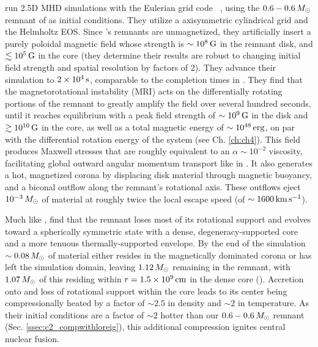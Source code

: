 \cite{ji+13} run 2.5D MHD simulations with the Eulerian grid code \flash\ \citep{fryx+00}, using the $0.6 - 0.6\,\Msun$ remnant of \citeal{loreig09} as initial conditions.  They utilize a axisymmetric cylindrical grid and the Helmholtz EOS.  Since \citeal{loreig09}'s remnants are unmagnetized, they artificially insert a purely poloidal magnetic field whose strength is $\sim10^8\,\mathrm{G}$ in the remnant disk, and $\lesssim10^5\,\mathrm{G}$ in the core (they determine their results are robust to changing initial field strength and spatial resolution by factors of 2).  They advance their simulation to $2\times10^4\,\mathrm{s}$, comparable to the completion times in \cite{schw+12}.  They find that the magnetorotational instability (MRI) acts on the differentially rotating portions of the remnant to greatly amplify the field over several hundred seconds, until it reaches equilibrium with a peak field strength of $\sim10^9\,\mathrm{G}$ in the disk and $\gtrsim10^{10}\,\mathrm{G}$ in the core, as well as a total magnetic energy of $\sim10^{48}\,\mathrm{erg}$, on par with the differential rotation energy of the system (see Ch. \ref{ch:ch4}).  This field produces Maxwell stresses that are roughly equivalent to an $\alpha \sim 10^{-2}$ viscosity, facilitating global outward angular momentum transport like in \cite{schw+12}.  It also generates a hot, magnetized corona by displacing disk material through magnetic buoyancy, and a biconal outflow along the remnant's rotational axis.  These outflows eject $10^{-3}\,\Msun$ of material at roughly twice the local escape speed (of $\sim1600\,\mrm{km}\,\psec$).  

Much like \cite{schw+12}, \cite{ji+13} find that the remnant loses most of its rotational support and evolves toward a spherically symmetric state with a dense, degeneracy-supported core and a more tenuous thermally-supported envelope.  By the end of the simulation $\sim0.08\,\Msun$ of material either resides in the magnetically dominated corona or has left the simulation domain, leaving $1.12\,\Msun$ remaining in the remnant, with $1.07\,\Msun$ of this residing within $r = 1.5\times10^9\,\mathrm{cm}$ in the dense core (\bobjiprivcomm).  Accretion onto and loss of rotational support within the core leads to its center being compressionally heated by a factor of $\sim2.5$ in density and $\sim2$ in temperature.  As their initial conditions are a factor of $\sim2$ hotter than our $0.6 - 0.6\,\Msun$ remnant (Sec. \ref{ssec:c2_compwithloreig}), this additional compression ignites central nuclear fusion.


